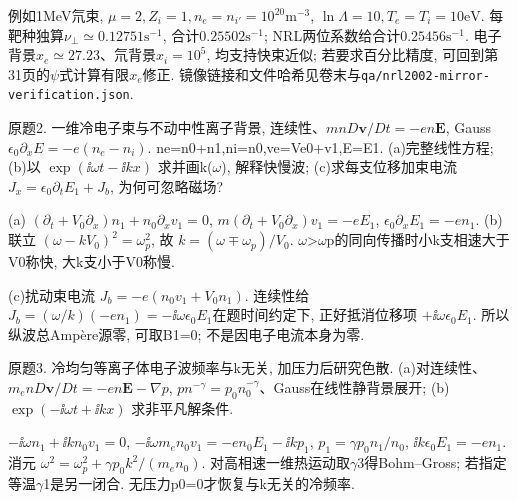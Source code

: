 \begin{solution}
例如1MeV氘束, $\mu=2,Z_i=1,n_e=n_{i'}=10^{20}\mathrm{m}^{-3}$,
$\ln\Lambda=10,T_e=T_i=10\mathrm{eV}$. 每靶种独算$\nu_\perp\simeq0.12751\mathrm{s}^{-1}$, 合计$0.25502\mathrm{s}^{-1}$;
NRL两位系数给合计$0.25456\mathrm{s}^{-1}$. 电子背景$x_e\simeq27.23$、氘背景$x_i=10^5$, 均支持快束近似; 若要求百分比精度, 可回到第31页的$\psi$式计算有限$x_e$修正. 镜像链接和文件哈希见卷末与\texttt{qa/nrl2002-mirror-verification.json}.
\end{solution}
\begin{exercise}\label{ex:06-4-2}
原题2. 一维冷电子束与不动中性离子背景, 连续性、$mnD\mathbf v/Dt=-en\mathbf E$, Gauss $\epsilon_0\partial_xE=-e(n_e-n_i)$. ne=n0+n1,ni=n0,ve=Ve0+v1,E=E1. (a)完整线性方程; (b)以 $\exp(\ii\omega t-\ii kx)$ 求并画k(\ensuremath{\omega}), 解释快慢波; (c)求每支位移加束电流 $J_x=\epsilon_0\partial_tE_1+J_b$, 为何可忽略磁场?
\end{exercise}
\begin{solution}
(a) $(\partial_t+V_0\partial_x)n_1+n_0\partial_xv_1=0$, $m(\partial_t+V_0\partial_x)v_1=-eE_1$, $\epsilon_0\partial_xE_1=-en_1$. (b)联立 $(\omega-kV_0)^2=\omega_p^2$, 故 $k=(\omega\mp\omega_p)/V_0$. \ensuremath{\omega}>\ensuremath{\omega}p的同向传播时小k支相速大于V0称快, 大k支小于V0称慢.
\begin{center}\end{center}
(c)扰动束电流 $J_b=-e(n_0v_1+V_0n_1)$. 连续性给 $J_b=(\omega/k)(-en_1)=-\ii\omega\epsilon_0E_1$在题时间约定下, 正好抵消位移项 $+\ii\omega\epsilon_0E_1$. 所以纵波总Amp\`ere源零, 可取B1=0; 不是因电子电流本身为零.
\end{solution}
\begin{exercise}\label{ex:06-4-3}
原题3. 冷均匀等离子体电子波频率与k无关, 加压力后研究色散. (a)对连续性、$m_enD\mathbf v/Dt=-en\mathbf E-\nabla p$, $pn^{-\gamma}=p_0n_0^{-\gamma}$、Gauss在线性静背景展开; (b) $\exp(-\ii\omega t+\ii kx)$ 求非平凡解条件.
\end{exercise}
\begin{solution}
$-\ii\omega n_1+\ii kn_0v_1=0$, $-\ii\omega m_en_0v_1=-en_0E_1-\ii kp_1$, $p_1=\gamma p_0n_1/n_0$, $\ii k\epsilon_0E_1=-en_1$. 消元 $\omega^2=\omega_p^2+\gamma p_0k^2/(m_en_0)$. 对高相速一维热运动取\ensuremath{\gamma}3得Bohm--Gross; 若指定等温\ensuremath{\gamma}1是另一闭合. 无压力p0=0才恢复与k无关的冷频率.
\end{solution}
